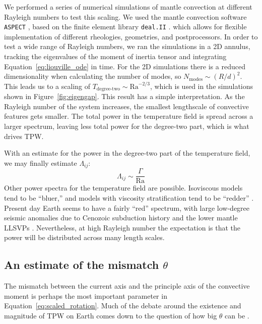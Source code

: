 \documentclass[extra,mreferee]{gji}
\begin{document}
We performed a series of numerical simulations of mantle convection at different Rayleigh numbers to test this scaling.
We used the mantle convection software \texttt{ASPECT} \citep{kronbichler2012high}, based on the finite element library \texttt{deal.II} \citep{dealII82}.
which allows for flexible implementation of different rheologies, geometries, and postprocessors.
In order to test a wide range of Rayleigh numbers, we ran the simulations in a 2D annulus, tracking the eigenvalues of the 
moment of inertia tensor and integrating Equation~\eqref{eq:liouville_ode} in time.
For the 2D simulations there is a reduced dimensionality when calculating the number of modes,
so $N_\text{modes} \sim \left(R/d \right)^2$.  This leads us to a scaling of $T_{\text{degree-two}} \sim \mathrm{Ra}^{-2/3}$, which is used in the simulations shown in Figure~\ref{fig:eigengap}.
This result has a simple interpretation.
As the Rayleigh number of the system increases, the smallest lengthscale of convective features gets smaller.
The total power in the temperature field is spread across a larger spectrum, leaving less total power for the degree-two part, which is what drives TPW.


With an estimate for the power in the degree-two part of the temperature field, we may finally estimate $\Lambda_{ij}$:
\begin{equation}
\Lambda_{ij} \sim \frac{\Gamma}{\mathrm{Ra} }
\end{equation}
Other power spectra for the temperature field are possible. Isoviscous models tend to be ``bluer,'' and models with viscosity stratification tend to be ``redder'' \citep{richards1999polar}.
Present day Earth seems to have a fairly ``red'' spectrum, with large low-degree seismic anomalies due to 
Cenozoic subduction history and the lower mantle LLSVPs \citep{dziewonski2010mantle}.
Nevertheless, at high Rayleigh number the expectation is that the power will be distributed across many length scales.


\subsection{An estimate of the mismatch $\theta$}
\label{sec:theta}

The mismatch between the current axis and the principle axis of the convective moment is perhaps the most important parameter in Equation~\eqref{eq:scaled_rotation}.  
Much of the debate around the existence and magnitude of TPW on Earth comes down to the question of how big $\theta$ can be \citep{kirschvink1997evidence, steinberger1997changes}.
\end{document}
